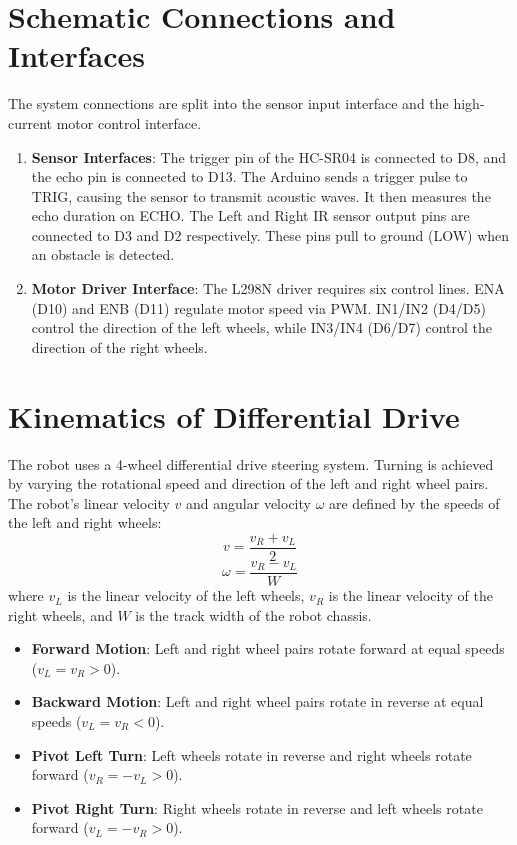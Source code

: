 \documentclass[12pt,a4paper,oneside]{report}
\begin{document}
\section{Schematic Connections and Interfaces}
The system connections are split into the sensor input interface and the high-current motor control interface.
\begin{enumerate}[noitemsep,topsep=2pt,parsep=0pt,partopsep=0pt]
    \item \textbf{Sensor Interfaces}: The trigger pin of the HC-SR04 is connected to D8, and the echo pin is connected to D13. The Arduino sends a trigger pulse to TRIG, causing the sensor to transmit acoustic waves. It then measures the echo duration on ECHO. The Left and Right IR sensor output pins are connected to D3 and D2 respectively. These pins pull to ground (LOW) when an obstacle is detected.
    \item \textbf{Motor Driver Interface}: The L298N driver requires six control lines. ENA (D10) and ENB (D11) regulate motor speed via PWM. IN1/IN2 (D4/D5) control the direction of the left wheels, while IN3/IN4 (D6/D7) control the direction of the right wheels.
\end{enumerate}

\section{Kinematics of Differential Drive}
The robot uses a 4-wheel differential drive steering system. Turning is achieved by varying the rotational speed and direction of the left and right wheel pairs. The robot's linear velocity $v$ and angular velocity $\omega$ are defined by the speeds of the left and right wheels:
\begin{equation}
v = \frac{v_R + v_L}{2}
\end{equation}
\begin{equation}
\omega = \frac{v_R - v_L}{W}
\end{equation}
where $v_L$ is the linear velocity of the left wheels, $v_R$ is the linear velocity of the right wheels, and $W$ is the track width of the robot chassis.
\begin{itemize}[noitemsep,topsep=2pt,parsep=0pt,partopsep=0pt]
    \item \textbf{Forward Motion}: Left and right wheel pairs rotate forward at equal speeds ($v_L = v_R > 0$).
    \item \textbf{Backward Motion}: Left and right wheel pairs rotate in reverse at equal speeds ($v_L = v_R < 0$).
    \item \textbf{Pivot Left Turn}: Left wheels rotate in reverse and right wheels rotate forward ($v_R = -v_L > 0$).
    \item \textbf{Pivot Right Turn}: Right wheels rotate in reverse and left wheels rotate forward ($v_L = -v_R > 0$).
\end{itemize}
\end{document}
